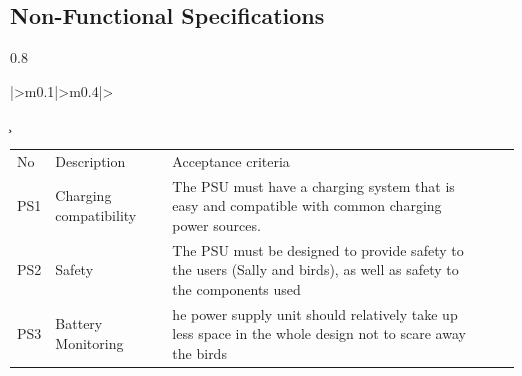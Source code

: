 \documentclass[class=report,11pt,crop=false]{standalone}
\begin{document}
	\subsection{Non-Functional Specifications}
	
			\begin{table}[h!]
				\centering
				\caption{Non-Functional Specifications for Power Subsystem}
				\label{tab:P1}
				\begin{tabularx}{0.8\textwidth}{|>{\centering\arraybackslash}m{0.1\linewidth}|>{\centering\arraybackslash}m{0.4\linewidth}|>{\c
					\begin{table}[]
						\begin{tabular}{lllll}
							No  & Description            & Acceptance criteria                                                                                                 &  &  \\
							PS1 & Charging compatibility & The PSU must have a charging system that is easy and compatible with common charging power sources.                 &  &  \\
							PS2 & Safety                 & The PSU must be designed to provide safety to the users (Sally and birds), as well as safety to the components used &  &  \\
							PS3 & Battery Monitoring     & he power supply unit should relatively take up less space in the whole design not to scare away the birds           &  & 
						\end{tabular}
					\end{table}
					
}}
\end{tabularx}
\end{table}
\end{document}
